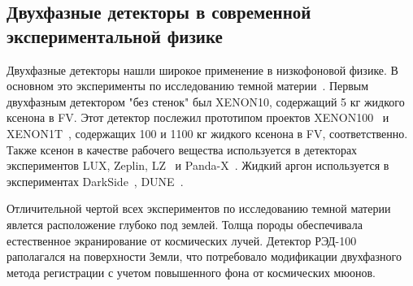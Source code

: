 \subsection{Двухфазные детекторы в современной экспериментальной физике}
\label{sect1_2_2}
Двухфазные детекторы нашли широкое применение в низкофоновой физике. В основном это эксперименты по исследованию темной материи~\cite{BOLOZDYNYA2015405}. Первым двухфазным детектором "без стенок" был XENON10, содержащий 5 кг жидкого ксенона в FV. Этот детектор послежил прототипом проектов XENON100~\cite{Xenon10} и XENON1T~\cite{Xenon100}, содержащих 100 и 1100 кг жидкого ксенона в FV, соответственно. Также ксенон в качестве рабочего вещества используется в детекторах экспериментов LUX, Zeplin, LZ~\cite{LZ} и Panda-X~\cite{Xiao:2017vys}. Жидкий аргон используется в экспериментах DarkSide~\cite{DarkSide:2014llq}, DUNE~\cite{Chardonnet_2020}.
\par Отличительной чертой всех экспериментов по исследованию темной материи явлется расположение глубоко под землей. Толща породы обеспечивала естественное экранирование от космических лучей. Детектор РЭД-100 раполагался на поверхности Земли, что потребовало модификации двухфазного метода регистрации с учетом повышенного фона от космических мюонов. 